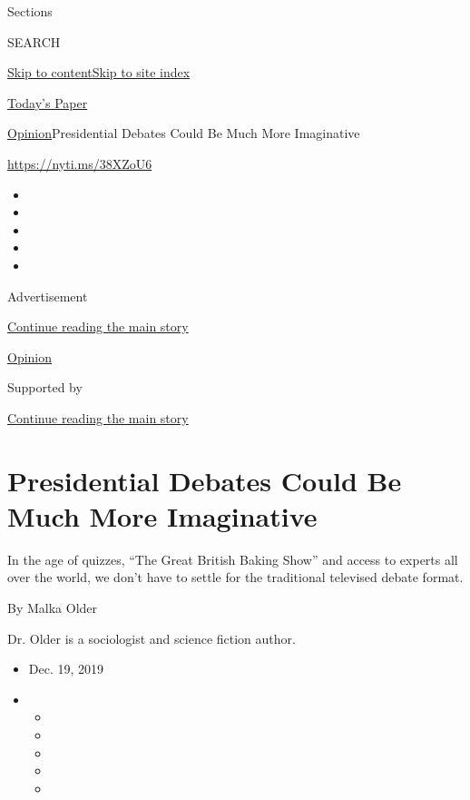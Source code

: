 Sections

SEARCH

\protect\hyperlink{site-content}{Skip to
content}\protect\hyperlink{site-index}{Skip to site index}

\href{https://myaccount.nytimes3xbfgragh.onion/auth/login?response_type=cookie\&client_id=vi}{}

\href{https://www.nytimes3xbfgragh.onion/section/todayspaper}{Today's
Paper}

\href{/section/opinion}{Opinion}\textbar{}Presidential Debates Could Be
Much More Imaginative

\url{https://nyti.ms/38XZoU6}

\begin{itemize}
\item
\item
\item
\item
\item
\end{itemize}

Advertisement

\protect\hyperlink{after-top}{Continue reading the main story}

\href{/section/opinion}{Opinion}

Supported by

\protect\hyperlink{after-sponsor}{Continue reading the main story}

\hypertarget{presidential-debates-could-be-much-more-imaginative}{%
\section{Presidential Debates Could Be Much More
Imaginative}\label{presidential-debates-could-be-much-more-imaginative}}

In the age of quizzes, ``The Great British Baking Show'' and access to
experts all over the world, we don't have to settle for the traditional
televised debate format.

By Malka Older

Dr. Older is a sociologist and science fiction author.

\begin{itemize}
\item
  Dec. 19, 2019
\item
  \begin{itemize}
  \item
  \item
  \item
  \item
  \item
  \end{itemize}
\end{itemize}

